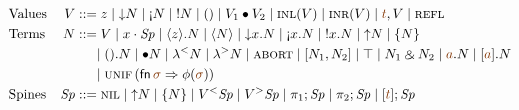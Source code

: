 \begin{align*}
& \mbox{Values} &
V & ::= z                     %
   \mid \tdownr{N}            %
   \mid \tgnabr{N}            %
   \mid \tbangr{N}            %
%
   \mid \toner
   \mid \tfuser{V_1}{V_2}     %
%  
   \mid \tinl{V}
   \mid \tinr{V}
   \mid \texistsr{\lf t}{V}
   \mid \tunifr
 \\
& \mbox{Terms} &
N & ::= \tfocusr{V}           %
   \mid \tfocusl{x}{\Sp}      %
   \mid \tetap{z}{N}          %
   \mid \tetan{N}             %
   \mid \tdownl{x}{N}         %
   \mid \tgnabl{x}{N}         %
   \mid \tbangl{x}{N}         %
   \mid \tupr{N}              %
   \mid \tlaxr{N}             %
\\ & & & ~~~~ %
   \mid \tonel{N}             %
   \mid \tfusel{N}            %
   \mid \tlaml{N}             %
   \mid \tlamr{N}             %
%
   \mid \tabort
   \mid \toplusl{N_1}{N_2}    %
   \mid \ttopr 
   \mid \twithr{N_1}{N_2}     %
   \mid \texistsl{\lf a}{N}
   \mid \tforallr{\lf a}{N}
\\ & & & ~~~~ %
   \mid {\textsc{unif}}\,({\sf fn}\,\lf{\sigma} \Rightarrow \phi(\lf\sigma))
\\
& \mbox{Spines} &
\Sp & ::= \tnil               %
   \mid \tupl{N}              %
   \mid \tlaxl{N}             %
   \mid \tappl{V}{\Sp}        %
   \mid \tappr{V}{\Sp}        %
   \mid \tpione{\Sp}          %
   \mid \tpitwo{\Sp}          %
   \mid \tforalll{\lf t}{\Sp}
\end{align*}
